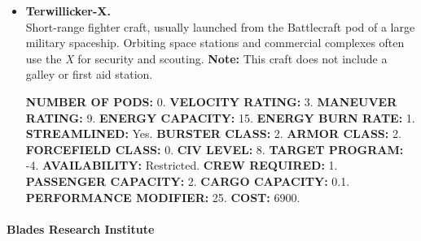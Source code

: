 \begin{itemize}
\item\textbf{Terwillicker-X.}\\
  Short-range fighter craft, usually launched from the Battlecraft pod
  of a large military spaceship. Orbiting space stations and
  commercial complexes often use the \emph{X} for security and
  scouting.  \textbf{Note:} This craft does not include a galley or
  first aid station.
  
  \textbf{NUMBER OF PODS:} 0. \textbf{VELOCITY RATING:} 3.
  \textbf{MANEUVER RATING:} 9. \textbf{ENERGY CAPACITY:} 15.
  \textbf{ENERGY BURN RATE:} 1. \textbf{STREAMLINED:}
  Yes. \textbf{BURSTER CLASS:} 2. \textbf{ARMOR CLASS:} 2.
  \textbf{FORCEFIELD CLASS:} 0. \textbf{CIV LEVEL:} 8. \textbf{TARGET
    PROGRAM:} -4. \textbf{AVAILABILITY:} Restricted. \textbf{CREW
    REQUIRED:} 1.  \textbf{PASSENGER CAPACITY:} 2. \textbf{CARGO
    CAPACITY:} 0.1. \textbf{PERFORMANCE MODIFIER:} 25. \textbf{COST:}
  6900.
\end{itemize}


\paragraph{Blades Research Institute}
\label{sec:hulls-blades}

